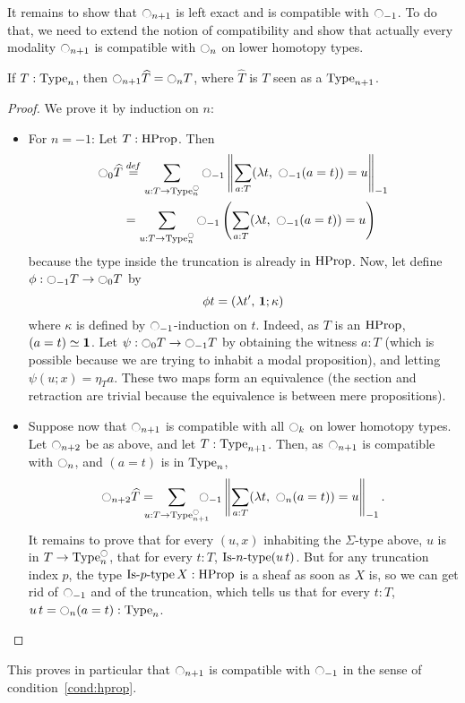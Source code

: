 It remains to show that $\ocircle_{n+1}$ is left exact and is compatible
with $\ocircle_{-1}$. To do that, we need to extend the notion of
compatibility and show that actually every modality $\ocircle_{n+1}$ is
compatible with $\ocircle_n$ on lower homotopy types.
\begin{prop} \label{prop:compatibility}
  If $T:\operatorname{Type}_n$, then $\ocircle_{n+1} \widehat T = \ocircle_n T$, where $\widehat T$ is $T$ seen as a
  $\operatorname{Type}_{n+1}$.
\end{prop}
\begin{proof}
  We prove it by induction on $n$:
  \begin{itemize}
  \item For $n=-1$: Let $T:\operatorname{HProp}$. Then
    \begin{align*}
      \ocircle_{0} \widehat T &\overset{de\hspace{-0.2ex}f}{=} \sum_{u:T \to \operatorname{Type}_n^{\ocircle}} \ocircle_{-1}\left\| \sum_{a:T} 
      (\lambda t,~\ocircle_{-1} (a=t)) = u\right\|_{-1} \\
      &= \sum_{u:T \to \operatorname{Type}_n^{\ocircle}} \ocircle_{-1}\left( \sum_{a:T} 
      (\lambda t,~\ocircle_{-1} (a=t)) = u\right)
    \end{align*}
    because the type inside the truncation is already in $\operatorname{HProp}$.
    Now, let define $\phi : \ocircle_{-1} T \to \ocircle_0T$ by
    \[\phi t = (\lambda t',\, \mathbf{1}
      ;\kappa)\]%
    where $\kappa$ is defined by $\ocircle_{-1}$-induction on
    $t$. Indeed, as $T$ is an $\operatorname{HProp}$, $(a=t) \simeq \mathbf{1}$. 
    Let $\psi : \ocircle_0T\to \ocircle_{-1} T$ by obtaining the
    witness $a:T$ (which is possible because we are trying to inhabit
    a modal proposition), and letting $\psi (u;x) = \eta_T a$.
    These two maps form an equivalence (the section and retraction are
    trivial because the equivalence is between mere propositions).
  \item Suppose now that $\ocircle_{n+1}$ is compatible with all $\ocircle_k$ on
    lower homotopy types. Let $\ocircle_{n+2}$ be as above, and let
    $T:\operatorname{Type}_{n+1}$. Then, as $\ocircle_{n+1}$ is compatible with $\ocircle_{n}$, and
    $(a=t)$ is in $\operatorname{Type}_n$,
    \[
      \ocircle_{n+2} \widehat T= \hspace{-1em} \sum_{u:T \to
        \operatorname{Type}_{n+1}^{\ocircle}} 
      \hspace{-1em} \ocircle_{-1}\left\| \sum_{a:T} 
        (\lambda t,~\ocircle_{n} (a=t)) = u\right\|_{-1}.
    \]%
    It remains to prove that for every $(u,x)$ inhabiting the
    $\Sigma$-type above, $u$ is in $T\to\operatorname{Type}_n^{\ocircle}$, \ie{} that for
    every $t:T$, $\mathop{\mathrm{Is{\hbox{-}}}n\mathrm{{\hbox{-}} type}} (u\, t)$.  But for any truncation index
    $p$,
    the type $\mathop{\mathrm{Is{\hbox{-}}}p\mathrm{{\hbox{-}} type}} X:\operatorname{HProp}$ is a sheaf as soon as $X$ is, so we can get rid
    of $\ocircle_{-1}$ and of the truncation, which tells us that for
    every 
    $t:T$, $u\, t = \ocircle_n(a=t) : \operatorname{Type}_n$. \qedhere
  \end{itemize}
\end{proof}
This proves in particular that $\ocircle_{n+1}$ is compatible with
$\ocircle_{-1}$ in the sense of condition~\ref{cond:hprop}.

